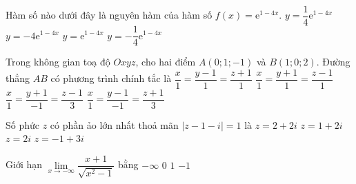 \begin{ex}%
	Hàm số nào dưới đây là nguyên hàm của hàm số $f(x)=\mathrm{e}^{1-4x}$.
	\choice
	{$y=\dfrac{1}{4}\mathrm{e}^{1-4x}$}
	{$y=-4\mathrm{e}^{1-4x}$}
	{$y=\mathrm{e}^{1-4x}$}
	{\True $y=-\dfrac{1}{4}\mathrm{e}^{1-4x}$}
\end{ex}

\begin{ex}%
	Trong không gian toạ độ $Oxyz$, cho hai điểm $A(0;1;-1)$ và $B(1;0;2)$. Đường thẳng $AB$ có phương trình chính tắc là
	\choice
	{$\dfrac{x}{1}=\dfrac{y-1}{1}=\dfrac{z+1}{1}$}
	{$\dfrac{x}{1}=\dfrac{y+1}{1}=\dfrac{z-1}{1}$}
	{$\dfrac{x}{1}=\dfrac{y+1}{-1}=\dfrac{z-1}{3}$}
	{\True $\dfrac{x}{1}=\dfrac{y-1}{-1}=\dfrac{z+1}{3}$}
\end{ex}

\begin{ex}%
	Số phức $z$ có phần ảo lớn nhất thoả mãn $|z-1-i|=1$ là
	\choice
	{$z=2+2i$}
	{\True $z=1+2i$}
	{$z=2i$}
	{$z=-1+3i$}
\end{ex}

\begin{ex}%
	Giới hạn $\displaystyle \lim\limits_{x\to -\infty} \dfrac{x+1}{\sqrt{x^2-1}}$ bằng
	\choice
	{$-\infty$}
	{$0$}
	{$1$}
	{\True $-1$}
\end{ex}

